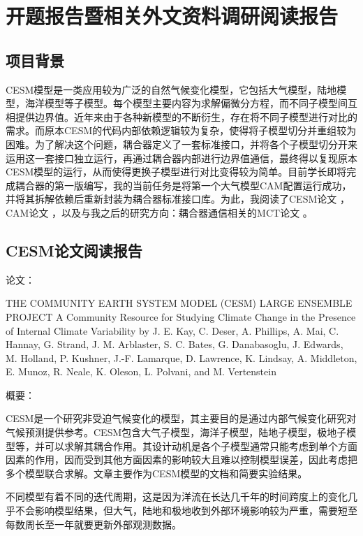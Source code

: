 \chapter{开题报告暨相关外文资料调研阅读报告}

\section{项目背景}

CESM模型是一类应用较为广泛的自然气候变化模型，它包括大气模型，陆地模型，海洋模型等子模型。每个模型主要内容为求解偏微分方程，而不同子模型间互相提供边界值。近年来由于各种新模型的不断衍生，存在将不同子模型进行对比的需求。而原本CESM的代码内部依赖逻辑较为复杂，使得将子模型切分并重组较为困难。为了解决这个问题，耦合器定义了一套标准接口，并将各个子模型切分开来运用这一套接口独立运行，再通过耦合器内部进行边界值通信，最终得以复现原本CESM模型的运行，从而使得更换子模型进行对比变得较为简单。目前学长即将完成耦合器的第一版编写，我的当前任务是将第一个大气模型CAM配置运行成功，并将其拆解依赖后重新封装为耦合器标准接口库。为此，我阅读了CESM论文\cite{OPENCESM} ，CAM论文 \cite{OPENCAM} ，以及与我之后的研究方向：耦合器通信相关的MCT论文 \cite{OPENMCT1} \cite{OPENMCT2}。

\section{CESM论文阅读报告}

论文：

THE COMMUNITY EARTH SYSTEM MODEL (CESM) LARGE ENSEMBLE PROJECT A Community Resource for Studying Climate Change in the Presence of Internal Climate Variability by J. E. Kay, C. Deser, A. Phillips, A. Mai, C. Hannay, G. Strand, J. M. Arblaster, S. C. Bates, G. Danabasoglu, J. Edwards, M. Holland, P. Kushner, J.-F. Lamarque, D. Lawrence, K. Lindsay, A. Middleton, E. Munoz, R. Neale, K. Oleson, L. Polvani, and M. Vertenstein

概要：

CESM是一个研究非受迫气候变化的模型，其主要目的是通过内部气候变化研究对气候预测提供参考。CESM包含大气子模型，海洋子模型，陆地子模型，极地子模型等，并可以求解其耦合作用。其设计动机是各个子模型通常只能考虑到单个方面因素的作用，因而受到其他方面因素的影响较大且难以控制模型误差，因此考虑把多个模型联合求解。文章主要作为CESM模型的文档和简要实验结果。

不同模型有着不同的迭代周期，这是因为洋流在长达几千年的时间跨度上的变化几乎不会影响模型结果，但大气，陆地和极地收到外部环境影响较为严重，需要短至每数周长至一年就要更新外部观测数据。

